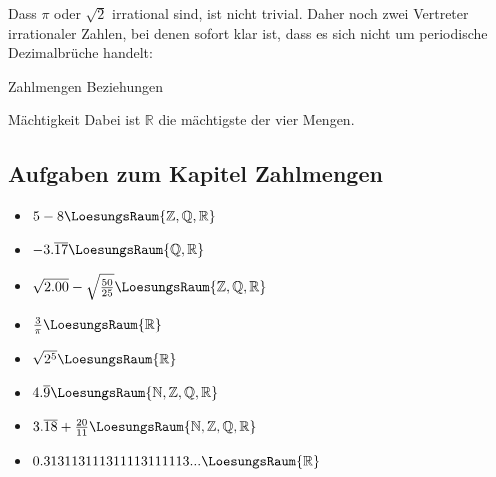 Dass $\pi$ oder $\sqrt{2}$ irrational sind, ist nicht trivial. Daher
noch zwei Vertreter irrationaler Zahlen, bei denen sofort klar ist,
dass es sich nicht um periodische Dezimalbrüche handelt:


\begin{gesetz}{Zahlmengen Beziehungen}{}
%
\noTRAINER{\vspace{15mm}}
\end{gesetz}


\begin{bemerkung}{Mächtigkeit}{}
  Dabei ist $\mathbb{R}$ die mächtigste der vier Mengen. 
\end{bemerkung}



\subsection*{Aufgaben zum Kapitel Zahlmengen}


\begin{itemize}
\item $5-8 \LoesungsRaum{\mathbb{Z,Q,R}}$
\item $-3.\overline{17} \LoesungsRaum{\mathbb{Q,R}}$
\item $\sqrt{2.00} - \sqrt{\frac{50}{25}} \LoesungsRaum{\mathbb{Z,Q,R}}$
\item $\frac{3}{\pi} \LoesungsRaum{\mathbb{R}}$
\item $\sqrt{2^5}\LoesungsRaum{\mathbb{R}}$
\item $4.\overline{9} \LoesungsRaum{\mathbb{N,Z,Q,R}}$
\item $3.\overline{18}+\frac{20}{11} \LoesungsRaum{\mathbb{N,Z,Q,R}}$
\item $0.313113111311113111113... \LoesungsRaum{\mathbb{R}}$
\end{itemize} 


\TNTeop{}
